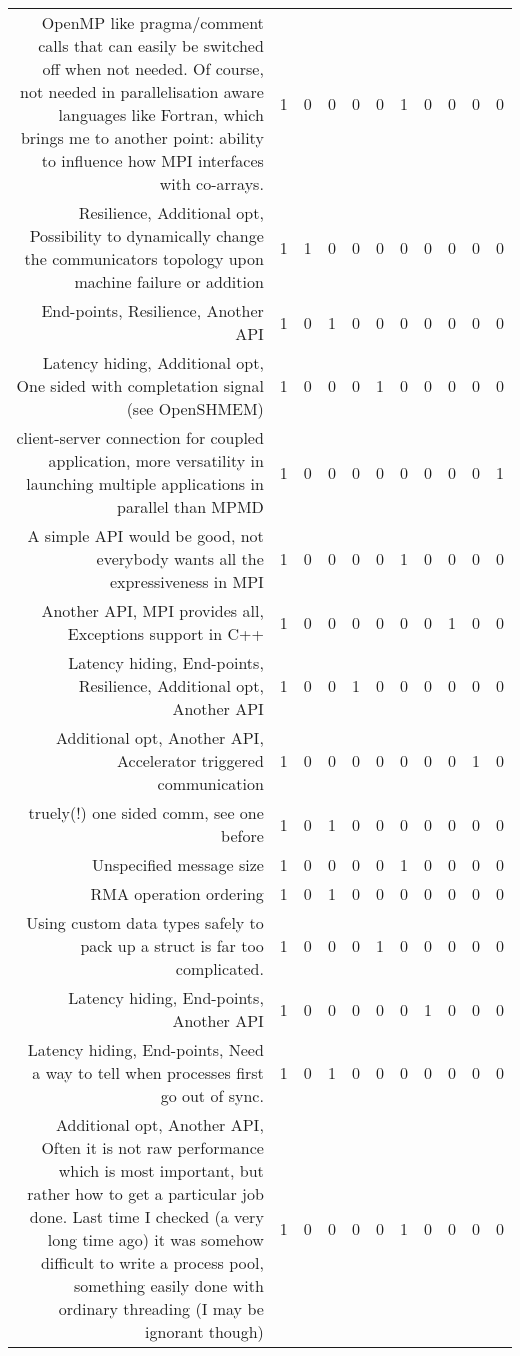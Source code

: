 {\begin{landscape}
\begin{longtable}[htb]{r|c|c|c|c|c|c|c|c|c|c}
{OpenMP like pragma/comment calls that can easily be switched off when not needed. Of course, not needed in parallelisation aware languages like Fortran, which brings me to another point: ability to influence how MPI interfaces with co-arrays.} & 1 & 0 & 0 & 0 & 0 & 1 & 0 & 0 & 0 & 0 \\%
{Resilience, Additional opt, Possibility to dynamically change the communicators topology upon machine failure or addition} & 1 & 1 & 0 & 0 & 0 & 0 & 0 & 0 & 0 & 0 \\%
{End-points, Resilience, Another API} & 1 & 0 & 1 & 0 & 0 & 0 & 0 & 0 & 0 & 0 \\%
{Latency hiding, Additional opt, One sided with completation signal (see OpenSHMEM)} & 1 & 0 & 0 & 0 & 1 & 0 & 0 & 0 & 0 & 0 \\%
{client-server connection for coupled application, more versatility in launching multiple applications in parallel than MPMD} & 1 & 0 & 0 & 0 & 0 & 0 & 0 & 0 & 0 & 1 \\%
{A simple API would be good, not everybody wants all the expressiveness in MPI} & 1 & 0 & 0 & 0 & 0 & 1 & 0 & 0 & 0 & 0 \\%
{Another API, MPI provides all, Exceptions support in C++} & 1 & 0 & 0 & 0 & 0 & 0 & 0 & 1 & 0 & 0 \\%
{Latency hiding, End-points, Resilience, Additional opt, Another API} & 1 & 0 & 0 & 1 & 0 & 0 & 0 & 0 & 0 & 0 \\%
{Additional opt, Another API, Accelerator triggered communication} & 1 & 0 & 0 & 0 & 0 & 0 & 0 & 0 & 1 & 0 \\%
{truely(!) one sided comm, see one before} & 1 & 0 & 1 & 0 & 0 & 0 & 0 & 0 & 0 & 0 \\%
{Unspecified message size} & 1 & 0 & 0 & 0 & 0 & 1 & 0 & 0 & 0 & 0 \\%
{RMA operation ordering} & 1 & 0 & 1 & 0 & 0 & 0 & 0 & 0 & 0 & 0 \\%
{Using custom data types safely to pack up a struct is far too complicated.} & 1 & 0 & 0 & 0 & 1 & 0 & 0 & 0 & 0 & 0 \\%
{Latency hiding, End-points, Another API} & 1 & 0 & 0 & 0 & 0 & 0 & 1 & 0 & 0 & 0 \\%
{Latency hiding, End-points, Need a way to tell when processes first go out of sync.} & 1 & 0 & 1 & 0 & 0 & 0 & 0 & 0 & 0 & 0 \\%
{Additional opt, Another API, Often it is not raw performance which is most important, but rather how to get a particular job done.  Last time I checked (a very long time ago) it was somehow difficult to write a process pool, something easily done with ordinary threading (I may be ignorant though)} & 1 & 0 & 0 & 0 & 0 & 1 & 0 & 0 & 0 & 0 \\%

\end{longtable}
\end{landscape}}
